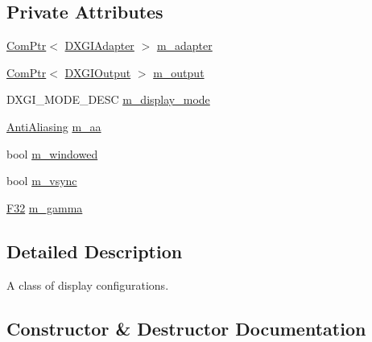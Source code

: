 \subsection*{Private Attributes}
\begin{DoxyCompactItemize}
\item 
\mbox{\hyperlink{namespacemage_ae74f374780900893caa5555d1031fd79}{Com\+Ptr}}$<$ \mbox{\hyperlink{namespacemage_1_1rendering_ad55e028ebd705b547eeb972ad8d03b6a}{D\+X\+G\+I\+Adapter}} $>$ \mbox{\hyperlink{classmage_1_1rendering_1_1_display_configuration_a307a8e6e0b1beb93175a6db519759e86}{m\+\_\+adapter}}
\item 
\mbox{\hyperlink{namespacemage_ae74f374780900893caa5555d1031fd79}{Com\+Ptr}}$<$ \mbox{\hyperlink{namespacemage_1_1rendering_aaf22d3893277a4bd8497f6ea69b01532}{D\+X\+G\+I\+Output}} $>$ \mbox{\hyperlink{classmage_1_1rendering_1_1_display_configuration_a3f43cbe5bb1a1a7c1bfb9ce66052fe0a}{m\+\_\+output}}
\item 
D\+X\+G\+I\+\_\+\+M\+O\+D\+E\+\_\+\+D\+E\+SC \mbox{\hyperlink{classmage_1_1rendering_1_1_display_configuration_a577ada006ada1b1e65a8deb817f0dafe}{m\+\_\+display\+\_\+mode}}
\item 
\mbox{\hyperlink{namespacemage_1_1rendering_ac3f75e49e92b42f2f5fb55c450d8899c}{Anti\+Aliasing}} \mbox{\hyperlink{classmage_1_1rendering_1_1_display_configuration_a03754a6d492393f70f68c619311dfa4c}{m\+\_\+aa}}
\item 
bool \mbox{\hyperlink{classmage_1_1rendering_1_1_display_configuration_a9d2117628e8b8f6a9b6548a9c0b11c36}{m\+\_\+windowed}}
\item 
bool \mbox{\hyperlink{classmage_1_1rendering_1_1_display_configuration_a749335db324a29c8b4ac30acf1c5361d}{m\+\_\+vsync}}
\item 
\mbox{\hyperlink{namespacemage_aa97e833b45f06d60a0a9c4fc22ae02c0}{F32}} \mbox{\hyperlink{classmage_1_1rendering_1_1_display_configuration_ac01844bb757c13e438c9ef3281becd4e}{m\+\_\+gamma}}
\end{DoxyCompactItemize}


\subsection{Detailed Description}
A class of display configurations. 

\subsection{Constructor \& Destructor Documentation}
\mbox{\label{classmage_1_1rendering_1_1_display_configuration_ac0ee7768a59ee6a257405faaa942580b}} 
